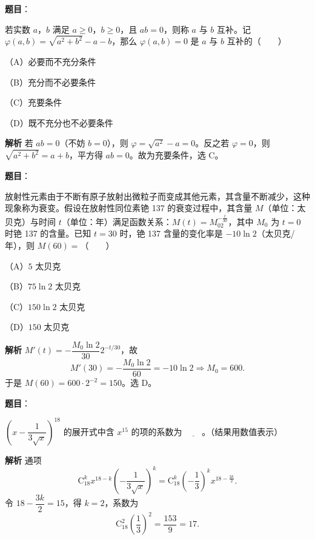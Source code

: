\begin{answer}

\textbf{题目}：

若实数 $a$，$b$ 满足 $a\geqslant0$，$b\geqslant0$，且 $ab=0$，则称 $a$ 与 $b$ 互补。记 $\varphi(a,b)=\sqrt{a^2+b^2}-a-b$，那么 $\varphi(a,b)=0$ 是 $a$ 与 $b$ 互补的\mbox{（　　）}

（A）必要而不充分条件

（B）充分而不必要条件

（C）充要条件

（D）既不充分也不必要条件

\textbf{解析}
若 $ab=0$（不妨 $b=0$），则 $\varphi=\sqrt{a^2}-a=0$。反之若 $\varphi=0$，则 $\sqrt{a^2+b^2}=a+b$，平方得 $ab=0$。故为充要条件，选 C。


\end{answer}
\begin{answer}

\textbf{题目}：

放射性元素由于不断有原子放射出微粒子而变成其他元素，其含量不断减少，这种现象称为衰变。假设在放射性同位素铯 137 的衰变过程中，其含量 $M$（单位：太贝克）与时间 $t$（单位：年）满足函数关系：$M(t)=M_02^{-\frac t{30}}$，其中 $M_0$ 为 $t=0$ 时铯 137 的含量。已知 $t=30$ 时，铯 137 含量的变化率是 $-10\ln2$（太贝克/年），则 $M(60)=$\mbox{（　　）}

（A）$5$ 太贝克

（B）$75\ln2$ 太贝克

（C）$150\ln2$ 太贝克

（D）$150$ 太贝克

\textbf{解析}
$M'(t)=-\dfrac{M_0\ln2}{30}2^{-t/30}$，故
\nopagebreak[4]
\[M'(30)=-\frac{M_0\ln2}{60}=-10\ln2\Longrightarrow M_0=600.\]
于是 $M(60)=600\cdot2^{-2}=150$。选 D。


\end{answer}
\begin{answer}

\textbf{题目}：

$\left(x-\dfrac1{3\sqrt x}\right)^{18}$ 的展开式中含 $x^{15}$ 的项的系数为 $\underline{\qquad}$。（结果用数值表示）

\textbf{解析}
通项
\nopagebreak[4]
\[\mathrm C_{18}^k x^{18-k}\left(-\frac1{3\sqrt x}\right)^k=\mathrm C_{18}^k\left(-\frac13\right)^k x^{18-\frac{3k}2}.\]
令 $18-\dfrac{3k}2=15$，得 $k=2$，系数为
\nopagebreak[4]
\[\mathrm C_{18}^2\left(\frac13\right)^2=\frac{153}9=17.\]


\end{answer}
